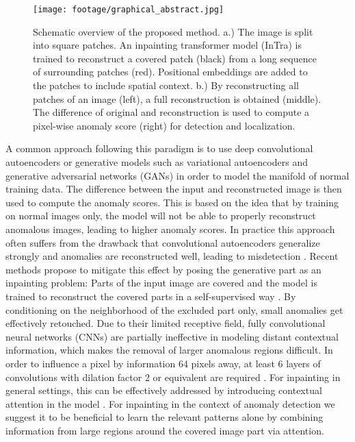 \documentclass[final,5p,times,twocolumn]{elsarticle}
\begin{document}
	\begin{figure}[t]
		\centering
		\texttt{[image: footage/graphical\_abstract.jpg]}
		\caption{Schematic overview of the proposed method.
			a.) The image is split into square patches. An inpainting transformer model (InTra) is trained to reconstruct a covered patch (black) from a long sequence of surrounding patches (red). Positional embeddings are added to the patches to include spatial context. b.) By reconstructing all patches of an image (left), a full reconstruction is obtained (middle). The difference of original and reconstruction is used to compute a pixel-wise anomaly score (right) for detection and localization.
		}
		\label{fig:graphical_abstract}
	\end{figure}
	
	A common approach following this paradigm is to use deep convolutional autoencoders or generative models such as variational autoencoders \cite{MvtecAd2019,Bergmann2019ssimanom,2018arXiv180701349L} and generative adversarial networks (GANs) \cite{gans2014,anogan2017,akcay2018ganomaly} in order to model the manifold of normal training data. The difference between the input and reconstructed image is then used to compute the anomaly scores. This is based on the idea that by training on normal images only, the model will not be able to properly reconstruct anomalous images, leading to higher anomaly scores. In practice this approach often suffers from the drawback that convolutional autoencoders generalize strongly and anomalies are reconstructed well, leading to misdetection \cite{gong2019memorizing}. Recent methods propose to mitigate this effect by posing the generative part as an inpainting problem: Parts of the input image are covered and the model is trained to reconstruct the covered parts in a self-supervised way \cite{Bhattad2018DetectingAF,8614226,ZAVRTANIK2021107706,DBLP:journals/corr/abs-2010-01942}. By conditioning on the neighborhood of the excluded part only, small anomalies get effectively retouched. Due to their limited receptive field, fully convolutional neural networks (CNNs) are partially ineffective in modeling distant contextual information, which makes the removal of larger anomalous regions difficult. In order to influence a pixel by information 64 pixels away, at least 6 layers of  convolutions with dilation factor 2 or equivalent are required \cite{Yu:2016:MCA,Yu_2018_CVPR}. For inpainting in general settings, this can be effectively addressed by introducing contextual attention in the model \cite{Yu_2018_CVPR}. For inpainting in the context of anomaly detection we suggest it to be beneficial to learn the relevant patterns alone by combining information from large regions around the covered image part via attention.
	
\end{document}
